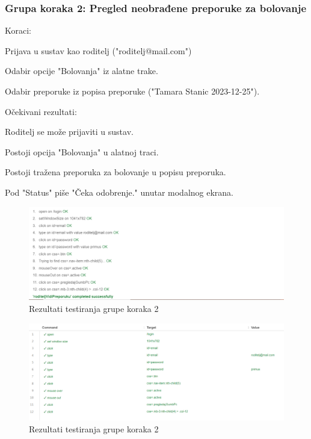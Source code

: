			 \subsubsection*{Grupa koraka 2: Pregled neobrađene preporuke za bolovanje}
			 Koraci:
			 \begin{packed_enum}
				\item Prijava u sustav kao roditelj ("roditelj@mail.com")
				\item Odabir opcije "Bolovanja" iz alatne trake.
				\item Odabir preporuke iz popisa preporuke ("Tamara Stanic 2023-12-25").
			 \end{packed_enum}
			 Očekivani rezultati:
			 \begin{packed_enum}
				\item Roditelj se može prijaviti u sustav.
				\item Postoji opcija "Bolovanja" u alatnoj traci.
				\item Postoji tražena preporuka za bolovanje u popisu preporuka.
				\item Pod "Status" piše "Čeka odobrenje." unutar modalnog ekrana.
			 \end{packed_enum}

			 
			 \begin{figure}[H]
				\includegraphics[width=\textwidth]{slike/selenium2.1.png} 
				\caption{Rezultati testiranja grupe koraka 2} 
			\end{figure}

			\begin{figure}[H]
				\includegraphics[width=\textwidth]{slike/selenium2.2.png} 
				\caption{Rezultati testiranja grupe koraka 2} 
			\end{figure}


